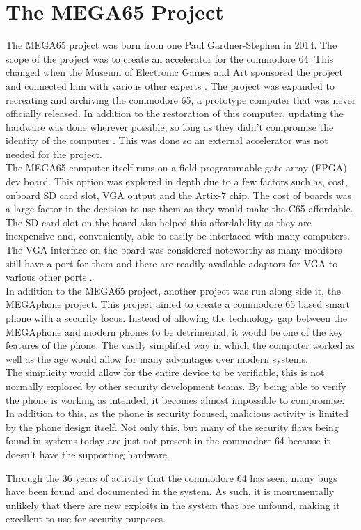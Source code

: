 
\section{The MEGA65 Project}

\label{Ch2 Sec4}

The MEGA65 project was born from one Paul Gardner-Stephen in 2014.
The scope of the project was to create an accelerator for the commodore 64.
This changed when the Museum of Electronic Games and Art sponsored the project and connected him with various other experts \cite{Reference27}.
The project was expanded to recreating and archiving the commodore 65, a prototype computer that was never officially released.
In addition to the restoration of this computer, updating the hardware was done wherever possible, so long as they didn’t compromise the identity of the computer \cite{Reference27}.
This was done so an external accelerator was not needed for the project.\\

The MEGA65 computer itself runs on a field programmable gate array (FPGA) dev board.
This option was explored in depth due to a few factors such as, cost, onboard SD card slot, VGA output and the Artix-7 chip.
The cost of boards was a large factor in the decision to use them as they would make the C65 affordable.
The SD card slot on the board also helped this affordability as they are inexpensive and, conveniently, able to easily be interfaced with many computers.
The VGA interface on the board was considered noteworthy as many monitors still have a port for them and there are readily available adaptors for VGA to various other ports \cite{Reference27}.\\

In addition to the MEGA65 project, another project was run along side it, the MEGAphone project.
This project aimed to create a commodore 65 based smart phone with a security focus.
Instead of allowing the technology gap between the MEGAphone and modern phones to be detrimental, it would be one of the key features of the phone.
The vastly simplified way in which the computer worked as well as the age would allow for many advantages over modern systems.\\

The simplicity would allow for the entire device to be verifiable, this is not normally explored by other security development teams.
By being able to verify the phone is working as intended, it becomes almost impossible to compromise.
In addition to this, as the phone is security focused, malicious activity is limited by the phone design itself.
Not only this, but many of the security flaws being found in systems today are just not present in the commodore 64 because it doesn’t have the supporting hardware.

Through the 36 years of activity that the commodore 64 has seen, many bugs have been found and documented in the system.
As such, it is monumentally unlikely that there are new exploits in the system that are unfound, making it excellent to use for security purposes.

